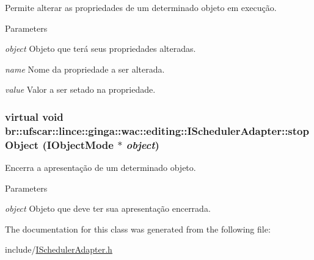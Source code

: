 Permite alterar as propriedades de um determinado objeto em execução. 


\begin{DoxyParams}{Parameters}
\item[{\em object}]Objeto que terá seus propriedades alteradas. \item[{\em name}]Nome da propriedade a ser alterada. \item[{\em value}]Valor a ser setado na propriedade. \end{DoxyParams}
\hypertarget{classbr_1_1ufscar_1_1lince_1_1ginga_1_1wac_1_1editing_1_1ISchedulerAdapter_ac9176e8b3c85cfc3fce05bbcb2285bd1}{
\subsubsection[{stopObject}]{\setlength{\rightskip}{0pt plus 5cm}virtual void br::ufscar::lince::ginga::wac::editing::ISchedulerAdapter::stopObject ({\bf IObjectMode} $\ast$ {\em object})}}
\label{classbr_1_1ufscar_1_1lince_1_1ginga_1_1wac_1_1editing_1_1ISchedulerAdapter_ac9176e8b3c85cfc3fce05bbcb2285bd1}


Encerra a apresentação de um determinado objeto. 


\begin{DoxyParams}{Parameters}
\item[{\em object}]Objeto que deve ter sua apresentação encerrada. \end{DoxyParams}


The documentation for this class was generated from the following file:\begin{DoxyCompactItemize}
\item 
include/\hyperlink{ISchedulerAdapter_8h}{ISchedulerAdapter.h}\end{DoxyCompactItemize}
